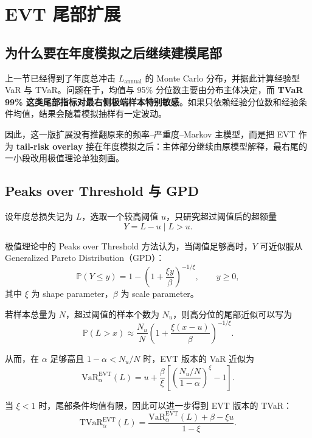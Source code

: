 \section{EVT 尾部扩展}

\subsection{为什么要在年度模拟之后继续建模尾部}

上一节已经得到了年度总冲击 $L_{\text{annual}}$ 的 Monte Carlo 分布，并据此计算经验型 VaR 与 TVaR。问题在于，均值与 95\% 分位数主要由分布主体决定，而 \textbf{TVaR 99\% 这类尾部指标对最右侧极端样本特别敏感}。如果只依赖经验分位数和经验条件均值，结果会随着模拟抽样有一定波动。

因此，这一版扩展没有推翻原来的频率--严重度--Markov 主模型，而是把 EVT 作为 \textbf{tail-risk overlay} 接在年度模拟之后：主体部分继续由原模型解释，最右尾的一小段改用极值理论单独刻画。

\subsection{Peaks over Threshold 与 GPD}

设年度总损失记为 $L$，选取一个较高阈值 $u$，只研究超过阈值后的超额量
\begin{equation}
Y = L - u \mid L > u.
\end{equation}

极值理论中的 Peaks over Threshold 方法认为，当阈值足够高时，$Y$ 可近似服从 Generalized Pareto Distribution（GPD）：
\begin{equation}
\mathbb{P}(Y \le y)
=
1 - \left(1 + \frac{\xi y}{\beta}\right)^{-1/\xi},
\qquad y \ge 0,
\end{equation}
其中 $\xi$ 为 shape parameter，$\beta$ 为 scale parameter。

若样本总量为 $N$，超过阈值的样本个数为 $N_u$，则高分位的尾部近似可以写为
\begin{equation}
\mathbb{P}(L > x)
\approx
\frac{N_u}{N}
\left(
1 + \frac{\xi(x-u)}{\beta}
\right)^{-1/\xi}.
\end{equation}

从而，在 $\alpha$ 足够高且 $1-\alpha < N_u/N$ 时，EVT 版本的 VaR 近似为
\begin{equation}
\mathrm{VaR}^{\mathrm{EVT}}_{\alpha}(L)
=
u + \frac{\beta}{\xi}
\left[
\left(
\frac{N_u/N}{1-\alpha}
\right)^{\xi} - 1
\right].
\end{equation}

当 $\xi < 1$ 时，尾部条件均值有限，因此可以进一步得到 EVT 版本的 TVaR：
\begin{equation}
\mathrm{TVaR}^{\mathrm{EVT}}_{\alpha}(L)
=
\frac{
\mathrm{VaR}^{\mathrm{EVT}}_{\alpha}(L) + \beta - \xi u
}{1-\xi}.
\end{equation}

